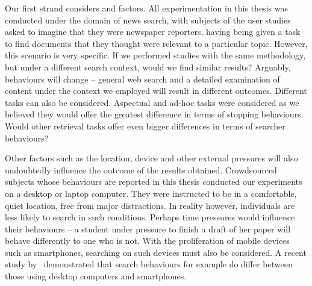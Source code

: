 \begin{figure}[h!]
    \centering
\end{figure}

Our first strand considers  and  factors. All experimentation in this thesis was conducted under the domain of news search, with subjects of the user studies asked to imagine that they were newspaper reporters, having being given a task to find documents that they thought were relevant to a particular topic. However, this scenario is very specific. If we performed studies with the same methodology, but under a different search context, would we find similar results? Arguably, behaviours will change -- general web search and a detailed examination of content under the context we employed will result in different outcomes. Different tasks can also be considered. Aspectual and ad-hoc tasks were considered as we believed they would offer the greatest difference in terms of stopping behaviours. Would other retrieval tasks offer even bigger differences in terms of searcher behaviours?

Other factors such as the location, device and other external pressures will also undoubtedly influence the outcome of the results obtained. Crowdsourced subjects whose behaviours are reported in this thesis conducted our experiments on a desktop or laptop computer. They were instructed to be in a comfortable, quiet location, free from major distractions. In reality however, individuals are less likely to search in such conditions. Perhaps time pressures would influence their behaviours -- a student under pressure to finish a draft of her paper will behave differently to one who is not. With the proliferation of mobile devices such as smartphones, searching on such devices must also be considered. A recent study by~\cite{ong2017scent_behaviour} demonstrated that search behaviours for example do differ between those using desktop computers and smartphones.

